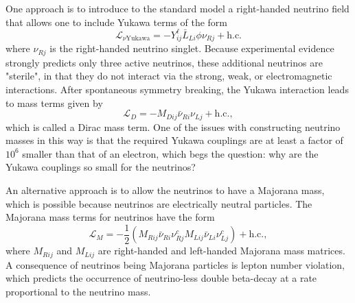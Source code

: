 One approach is to introduce to the standard model a right-handed neutrino field that allows one to include Yukawa terms of the form 
\begin{equation}
    \mathcal{L}_{\nu\textrm{Yukawa}} = -Y^\ell_{ij}\bar{L}_{Li}\phi \nu_{Rj}+\textrm{h.c.}
\end{equation}
where $\nu_{Rj}$ is the right-handed neutrino singlet. Because experimental evidence strongly predicts only three active neutrinos, these additional neutrinos are "sterile", in that they do not interact via the strong, weak, or electromagnetic interactions. After spontaneous symmetry breaking, the Yukawa interaction leads to mass terms given by 
\begin{equation}
    \mathcal{L}_{D}=-M_{Dij}\bar{\nu}_{Ri}\nu_{Lj} +\textrm{h.c.},
\end{equation}
which is called a Dirac mass term. One of the issues with constructing neutrino masses in this way is that the required Yukawa couplings are at least a factor of $10^6$ smaller than that of an electron, which begs the question: why are the Yukawa couplings so small for the neutrinos?

An alternative approach is to allow the neutrinos to have a Majorana mass, which is possible because neutrinos are electrically neutral particles. The Majorana mass terms for neutrinos have the form 
\begin{equation}
    \mathcal{L}_{M}=-\frac{1}{2}(M_{Rij}\bar{\nu}_{Ri}\nu_{Rj}^c M_{Lij}\bar{\nu}_{Li}\nu_{Lj}^c) +\textrm{h.c.},
\end{equation}
where $M_{Rij}$ and $M_{Lij}$ are right-handed and left-handed Majorana mass matrices. A consequence of neutrinos being Majorana particles is lepton number violation, which predicts the occurrence of neutrino-less double beta-decay at a rate proportional to the neutrino mass.

